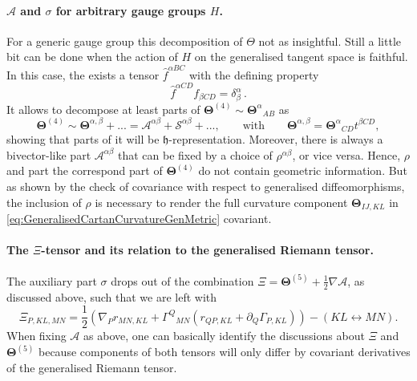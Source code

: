 \documentclass[11pt,a4paper]{article}
\numberwithin{equation}{section}
\begin{document}
\paragraph{$\mathcal{A}$ and $\sigma$ for arbitrary gauge groups $H$.} For a generic gauge group this decomposition of $\Theta$ not as insightful. Still a little bit can be done when the action of $H$ on the generalised tangent space is faithful. In this case, the exists a tensor $\widehat{f}^{\alpha B C}$ with the defining property
\begin{equation}
    \widehat{f}^{\alpha CD} f_{\beta CD} = \delta_\beta^\alpha\,.
\end{equation}
It allows to decompose at least parts of $\mathbf{\Theta}^{(4)} \sim {\mathbf{\Theta}^{\alpha}}_{AB}$ as
\begin{equation}
    \mathbf{\Theta}^{(4)} \sim \mathbf{\Theta}^{\alpha,\beta} + ... = \mathcal{A}^{\alpha\beta} + \mathcal{S}^{\alpha\beta} + ..., \qquad \text{with} \qquad \mathbf{\Theta}^{\alpha,\beta} = {\mathbf{\Theta}^\alpha}_{CD} t^{\beta CD},
\end{equation}
showing that parts of it will be $\mathfrak{h}$-representation. Moreover, there is always a bivector-like part $\mathcal{A}^{\alpha \beta}$ that can be fixed by a choice of $\rho^{\alpha \beta}$, or vice versa. Hence, $\rho$ and part the correspond part of $\mathbf{\Theta}^{(4)}$ do not contain geometric information. But as shown by the check of covariance with respect to generalised diffeomorphisms, the inclusion of $\rho$ is necessary to render the full curvature component $\mathbf{\Theta}_{IJ,KL}$ in  \eqref{eq:GeneralisedCartanCurvatureGenMetric} covariant.

\paragraph{The $\Xi$-tensor and its relation to the generalised Riemann tensor.} The auxiliary part $\sigma$ drops out of the combination $\Xi =  \mathbf{\Theta}^{(5)} + \frac{1}{2} \nabla \mathcal{A}$, as discussed above, such that we are left with
\begin{equation}
    \Xi_{P,KL,MN} = \frac{1}{2} \left( \nabla_{P} r_{MN,KL} + {\Gamma^Q}_{MN} \left(r_{QP,KL} + \partial_Q \Gamma_{P,KL} \right) \right) - (KL \leftrightarrow MN).
\end{equation}
When fixing $\mathcal{A}$ as above, one can basically identify the discussions about $\Xi$ and $\mathbf{\Theta}^{(5)}$ because components of both tensors will only differ by covariant derivatives of the generalised Riemann tensor.
\end{document}
